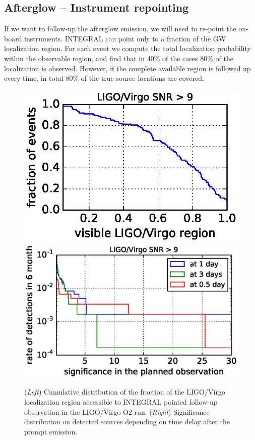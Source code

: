 \documentclass[11pt]{article}
\begin{document}
\subsection*{Afterglow -- Instrument repointing}

If we want to follow-up the afterglow emission, we will need to
re-point the on-board instruments.  INTEGRAL can point only to a
fraction of the GW localization region. For each event we compute the
total localization probability within the observable region, and find
that in 40\% of the cases 80\% of the localization is
observed. However, if the complete available region is followed up
every time, in total 80\% of the true source locations are covered.

\begin{figure}[!ht]
	\centering
  	\includegraphics[scale=.5]{P7-1_f3.eps}
  	\includegraphics[scale=.4]{P7-1_f4.eps}

  	\caption{(\textit{Left}) Cumulative distribution of the fraction of the
          LIGO/Virgo localization region accessible to INTEGRAL pointed
          follow-up observation in the LIGO/Virgo O2 run. (\textit{Right})
          Significance distribution on detected sources depending on time delay
          after the prompt emission.}
    \label{covered_region}
\end{figure}
\end{document}
